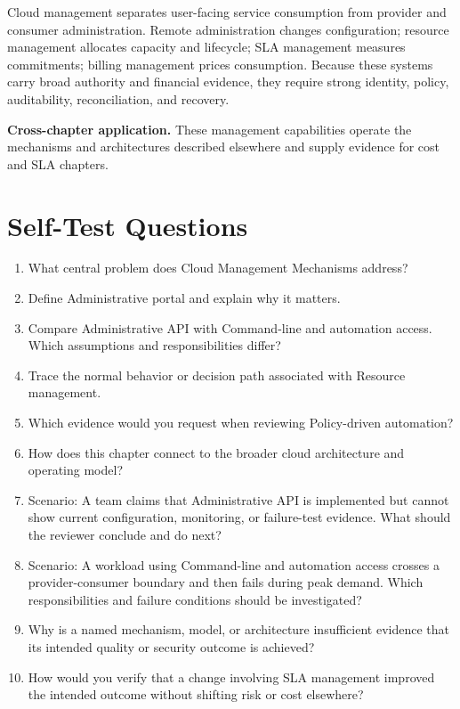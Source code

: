 \documentclass[11pt]{article}
\begin{document}
\begin{synthesisbox}
Cloud management separates user-facing service consumption from provider and consumer administration. Remote administration changes configuration; resource management allocates capacity and lifecycle; SLA management measures commitments; billing management prices consumption. Because these systems carry broad authority and financial evidence, they require strong identity, policy, auditability, reconciliation, and recovery.
\par\smallskip
\textbf{Cross-chapter application.} These management capabilities operate the mechanisms and architectures described elsewhere and supply evidence for cost and SLA chapters.
\end{synthesisbox}
\section{Self-Test Questions}
\begin{enumerate}
\item What central problem does Cloud Management Mechanisms address?
\item Define Administrative portal and explain why it matters.
\item Compare Administrative API with Command-line and automation access. Which assumptions and responsibilities differ?
\item Trace the normal behavior or decision path associated with Resource management.
\item Which evidence would you request when reviewing Policy-driven automation?
\item How does this chapter connect to the broader cloud architecture and operating model?
\item Scenario: A team claims that Administrative API is implemented but cannot show current configuration, monitoring, or failure-test evidence. What should the reviewer conclude and do next?
\item Scenario: A workload using Command-line and automation access crosses a provider-consumer boundary and then fails during peak demand. Which responsibilities and failure conditions should be investigated?
\item Why is a named mechanism, model, or architecture insufficient evidence that its intended quality or security outcome is achieved?
\item How would you verify that a change involving SLA management improved the intended outcome without shifting risk or cost elsewhere?
\end{enumerate}
\clearpage
\end{document}
